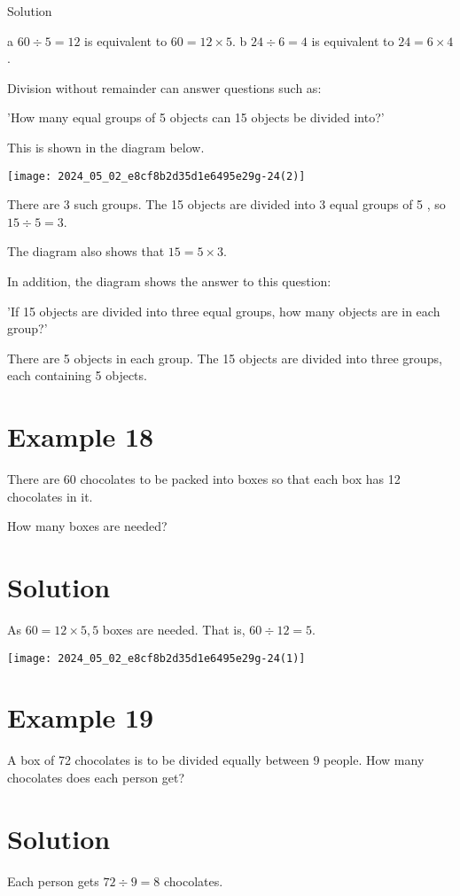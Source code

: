 \documentclass[10pt]{article}
\begin{document}
Solution

a \(60 \div 5=12\) is equivalent to \(60=12 \times 5\). b \(24 \div 6=4\) is equivalent to \(24=6 \times 4\).

Division without remainder can answer questions such as:

'How many equal groups of 5 objects can 15 objects be divided into?'

This is shown in the diagram below.

\begin{center}
\texttt{[image: 2024\_05\_02\_e8cf8b2d35d1e6495e29g-24(2)]}
\end{center}

There are 3 such groups. The 15 objects are divided into 3 equal groups of 5 , so \(15 \div 5=3\).

The diagram also shows that \(15=5 \times 3\).

In addition, the diagram shows the answer to this question:

'If 15 objects are divided into three equal groups, how many objects are in each group?'

There are 5 objects in each group. The 15 objects are divided into three groups, each containing 5 objects.

\section*{Example 18}
There are 60 chocolates to be packed into boxes so that each box has 12 chocolates in it.

How many boxes are needed?

\section*{Solution}
As \(60=12 \times 5,5\) boxes are needed. That is, \(60 \div 12=5\).

\begin{center}
\texttt{[image: 2024\_05\_02\_e8cf8b2d35d1e6495e29g-24(1)]}
\end{center}

\section*{Example 19}
A box of 72 chocolates is to be divided equally between 9 people. How many chocolates does each person get?

\section*{Solution}
Each person gets \(72 \div 9=8\) chocolates.
\end{document}

